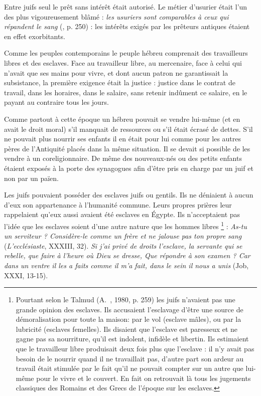   Entre juifs seul le prêt sans intérêt était autorisé. Le métier d'usurier était l'un des plus vigoureusement blâmé : {\emph{les usuriers sont comparables à ceux qui répandent le sang}} (, p. 250) : les intérêts exigés par les prêteurs antiques étaient en effet exorbitants. 

 Comme les peuples contemporains le peuple hébreu comprenait des travailleurs libres et des esclaves. Face au travailleur libre, au mercenaire, face à celui qui n'avait que ses mains pour vivre, et dont aucun patron ne garantissait la subsistance, la première exigence était la justice : justice dans le contrat de travail, dans les horaires, dans le salaire, sans retenir indûment ce salaire, en le payant au contraire tous les jours.

 Comme partout à cette époque un hébreu pouvait se vendre lui-même (et en avait le droit moral) s'il manquait de ressources ou s'il était écrasé de dettes. S'il ne pouvait plus nourrir ses enfants il en était pour lui comme pour les autres pères de l'Antiquité placés dans la même situation. Il se devait si possible de les vendre à un coreligionnaire. De même des nouveaux-nés ou des petits enfants étaient exposés à la porte des synagogues afin d'être pris en charge par un juif et non par un païen. 

 Les juifs pouvaient posséder des esclaves juifs ou gentils. Ils ne déniaient à aucun d'eux son appartenance à l'humanité commune. Leurs propres prières leur rappelaient qu'eux aussi avaient été esclaves en Égypte. Ils n'acceptaient pas l'idée que les esclaves soient d'une autre nature que les hommes libres%
\footnote{Pourtant selon le Talmud (A.~, 1980, p. 259) les juifs n'avaient pas une grande opinion des esclaves. Ils accusaient l'esclavage d'être une source de démoralisation pour toute la maison: par le vol (esclave mâles), ou par la lubricité (esclaves femelles). Ils disaient que l'esclave est paresseux et ne gagne pas sa nourriture, qu'il est indolent, infidèle et libertin. Ils estimaient que le travailleur libre produisait deux fois plus que l'esclave : il n'y avait pas besoin de le nourrir quand il ne travaillait pas, d'autre part son ardeur au travail était stimulée par le fait qu'il ne pouvait compter sur un autre que lui-même pour le vivre et le couvert. En fait on retrouvait là tous les jugements classiques des Romains et des Grecs de l'époque sur les esclaves.}%
 : {\emph{As-tu un serviteur ? Considère-le comme un frère et ne jalouse pas ton propre sang}} (\emph{L'ecclésiaste}, XXXIII, 32). {\emph{Si j'ai privé de droits l'esclave, la servante qui se rebelle, que faire à l'heure où Dieu se dresse, Que répondre à son examen ? Car dans un ventre il les a faits comme il m'a fait, dans le sein il nous a unis}} (Job, XXXI, 13-15). 


